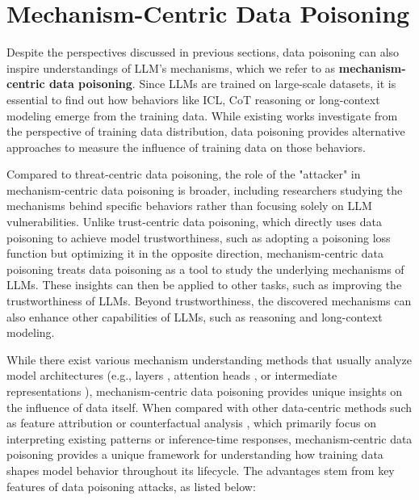 \section{Mechanism-Centric Data Poisoning} \label{section:mechanism}

Despite the perspectives discussed in previous sections, data poisoning can also inspire understandings of LLM's mechanisms, which we refer to as \textbf{mechanism-centric data poisoning}. Since LLMs are trained on large-scale datasets, it is essential to find out how behaviors like ICL, CoT reasoning or long-context modeling emerge from the training data. While existing works \citep{xie2021explanation, prystawski2024think} investigate from the perspective of training data distribution, data poisoning provides alternative approaches to measure the influence of training data on those behaviors.  

Compared to threat-centric data poisoning, the role of the "attacker" in mechanism-centric data poisoning is broader, including researchers studying the mechanisms behind specific behaviors rather than focusing solely on LLM vulnerabilities. Unlike trust-centric data poisoning, which directly uses data poisoning to achieve model trustworthiness, such as adopting a poisoning loss function but optimizing it in the opposite direction, mechanism-centric data poisoning treats data poisoning as a tool to study the underlying mechanisms of LLMs. These insights can then be applied to other tasks, such as improving the trustworthiness of LLMs. Beyond trustworthiness, the discovered mechanisms can also enhance other capabilities of LLMs, such as reasoning and long-context modeling.

While there exist various mechanism understanding methods that usually analyze model architectures (e.g., layers \citep{fan2024not}, attention heads \citep{olsson2022context}, or intermediate representations \citep{lin2024towards}), mechanism-centric data poisoning provides unique insights on the influence of data itself. When compared with other data-centric methods such as feature attribution \citep{zhou2022feature} or counterfactual analysis \citep{youssef2024llms}, which primarily focus on interpreting existing patterns or inference-time responses, mechanism-centric data poisoning provides a unique framework for understanding how training data shapes model behavior throughout its lifecycle.
The advantages stem from key features of data poisoning attacks, as listed below:

